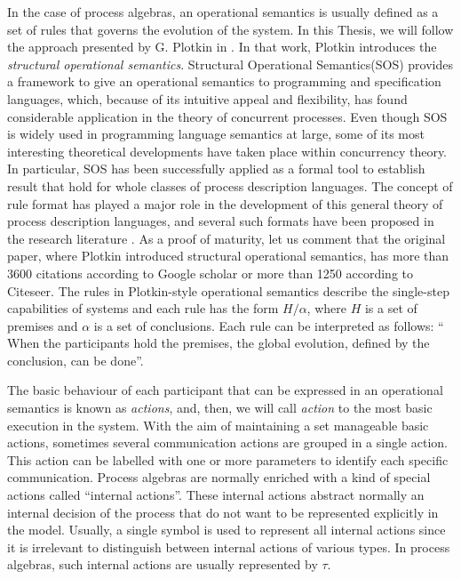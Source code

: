 In the case of process algebras, an operational semantics is usually defined as a set of rules 
that governs the evolution of the system. In this Thesis, we will follow the approach presented by G. Plotkin
in \cite{Plotkin81}. In that work, Plotkin introduces the \emph{structural operational semantics}.
Structural Operational Semantics(SOS)
provides a framework to give an operational
semantics to programming and specification languages,
which, because of its intuitive appeal and flexibility,
has found considerable application in the theory of concurrent
processes. Even though SOS is widely used in programming language semantics
at large, some of its most interesting theoretical developments have taken place
within concurrency theory. In particular, SOS has been successfully applied
as a formal tool to establish result that hold for whole classes of process description
languages. The concept of rule format has
played a major role in the development of
this general theory of process description
languages, and several such formats
have been proposed in the research literature \cite{aceto1999}. As a proof of maturity, let us comment that
the original paper, where Plotkin introduced structural operational semantics, 
has more than 3600 citations according to Google scholar or more than 1250 according to
Citeseer. The rules in Plotkin-style operational semantics describe the single-step capabilities of systems 
and each rule has the form $H/\alpha$, where $H$ is a set of premises and $\alpha$ is a set of conclusions.
Each rule can be interpreted as follows: `` When the participants hold the premises, 
the global evolution, defined by the conclusion, can be done''. 

The basic behaviour of each participant that can be expressed in an operational semantics
is known as \emph{actions}, and, then, we will call \emph{action}  to the most
basic execution in the system. With the aim of maintaining a set
manageable basic actions, sometimes several communication actions are grouped
in a single action. This action can be 
labelled with one or more parameters to
identify each specific communication. Process algebras are normally enriched
with a kind of special actions called ``internal actions''. These
internal actions abstract normally an internal decision of the process that 
do not want to be represented explicitly in the model. Usually, a single symbol is used to represent 
all internal actions since it is irrelevant to distinguish between internal actions
of various types. In process algebras, such
internal actions are usually represented by $\tau$.


